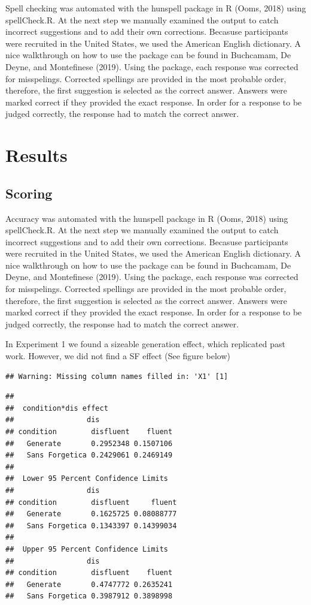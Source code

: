 \documentclass[doc]{apa6}
\begin{document}
Spell checking was automated with the hunspell package in R (Ooms, 2018) using spellCheck.R. At the next step we manually examined the output to catch incorrect suggestions and to add their own corrections. Becasuse participants were recruited in the United States, we used the American English dictionary. A nice walkthrough on how to use the package can be found in Buchcamam, De Deyne, and Montefinese (2019). Using the package, each response was corrected for misspelings. Corrected spellings are provided in the most probable order, therefore, the first suggestion is selected as the correct answer. Answers were marked correct if they provided the exact response. In order for a response to be judged correctly, the response had to match the correct answer.

\hypertarget{results}{%
\section{Results}\label{results}}

\hypertarget{scoring}{%
\subsection{Scoring}\label{scoring}}

Accuracy was automated with the hunspell package in R (Ooms, 2018) using spellCheck.R. At the next step we manually examined the output to catch incorrect suggestions and to add their own corrections. Becasuse participants were recruited in the United States, we used the American English dictionary. A nice walkthrough on how to use the package can be found in Buchcamam, De Deyne, and Montefinese (2019). Using the package, each response was corrected for misspelings. Corrected spellings are provided in the most probable order, therefore, the first suggestion is selected as the correct answer. Answers were marked correct if they provided the exact response. In order for a response to be judged correctly, the response had to match the correct answer.

In Experiment 1 we found a sizeable generation effect, which replicated past work. However, we did not find a SF effect (See figure below)

\begin{verbatim}
## Warning: Missing column names filled in: 'X1' [1]
\end{verbatim}

\begin{verbatim}
## 
##  condition*dis effect
##                 dis
## condition        disfluent    fluent
##   Generate       0.2952348 0.1507106
##   Sans Forgetica 0.2429061 0.2469149
## 
##  Lower 95 Percent Confidence Limits
##                 dis
## condition        disfluent     fluent
##   Generate       0.1625725 0.08088777
##   Sans Forgetica 0.1343397 0.14399034
## 
##  Upper 95 Percent Confidence Limits
##                 dis
## condition        disfluent    fluent
##   Generate       0.4747772 0.2635241
##   Sans Forgetica 0.3987912 0.3898998
\end{verbatim}
\end{document}

